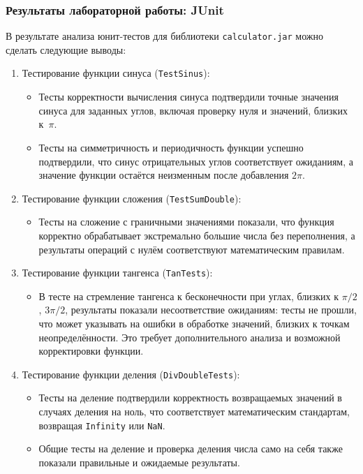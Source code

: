 \documentclass[areasetadvanced]{scrartcl}
\begin{document}
\subsubsection{Результаты лабораторной работы: JUnit}

В результате анализа юнит-тестов для библиотеки \texttt{calculator.jar} можно сделать следующие выводы:
\begin{enumerate}
  \item Тестирование функции синуса (\texttt{TestSinus}):
    \begin{itemize}
      \item Тесты корректности вычисления синуса подтвердили точные значения синуса для заданных углов, включая проверку нуля и значений, близких к~$\pi$.
      \item Тесты на симметричность и периодичность функции успешно подтвердили, что синус отрицательных углов соответствует ожиданиям, а значение функции остаётся неизменным после добавления $2\pi$.
    \end{itemize}

  \item Тестирование функции сложения (\texttt{TestSumDouble}):
    \begin{itemize}
      \item Тесты на сложение с граничными значениями показали, что функция корректно обрабатывает экстремально большие числа без переполнения, а результаты операций с нулём соответствуют математическим правилам.
    \end{itemize}

  \item Тестирование функции тангенса (\texttt{TanTests}):
    \begin{itemize}
      \item В тесте на стремление тангенса к бесконечности при углах, близких к $\pi/2$, $3\pi/2$, результаты показали несоответствие ожиданиям: тесты не прошли, что может указывать на ошибки в обработке значений, близких к точкам неопределённости. Это требует дополнительного анализа и возможной корректировки функции.
    \end{itemize}

  \item Тестирование функции деления (\texttt{DivDoubleTests}):
    \begin{itemize}
      \item Тесты на деление подтвердили корректность возвращаемых значений в случаях деления на ноль, что соответствует математическим стандартам, возвращая \texttt{Infinity} или \texttt{NaN}.
      \item Общие тесты на деление и проверка деления числа само на себя также показали правильные и ожидаемые результаты.
    \end{itemize}
\end{enumerate}
\end{document}
